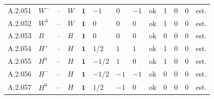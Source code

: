 {\begin{longtable}{@{}lllllllllllll@{}}
A.2.051 & $W^-$ & -- & $W$ & $\mathbf{1}$ & $-1$ & $0$ & $-1$ & ok & 1 & 0 & 0 & est. \\
A.2.052 & $W^3$ & -- & $W$ & $\mathbf{1}$ & $0$ & $0$ & $0$ & ok & 1 & 0 & 0 & est. \\
A.2.053 & $B$ & -- & $B$ & $\mathbf{1}$ & $0$ & $0$ & $0$ & ok & 0 & 0 & 0 & est. \\
A.2.054 & $H^+$ & -- & $H$ & $\mathbf{1}$ & $1/2$ & $1$ & $1$ & ok & 1 & 0 & 0 & est. \\
A.2.055 & $H^0$ & -- & $H$ & $\mathbf{1}$ & $-1/2$ & $1$ & $0$ & ok & 1 & 0 & 0 & est. \\
A.2.056 & $H^-$ & -- & $H$ & $\mathbf{1}$ & $-1/2$ & $-1$ & $-1$ & ok & 0 & 0 & 0 & est. \\
A.2.057 & $\overline{H^0}$ & -- & $H$ & $\mathbf{1}$ & $1/2$ & $-1$ & $0$ & ok & 0 & 0 & 0 & est. \\
\end{longtable}}
